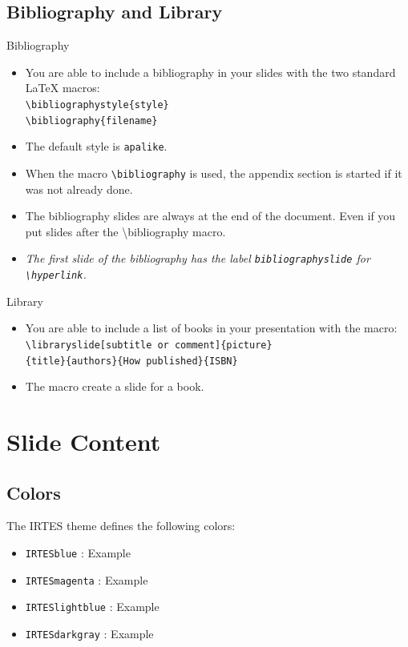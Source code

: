 \documentclass[english,circlenumberstyle]{irtesbeamer}
\begin{document}
\subsection{Bibliography and Library}
\begin{frame}{Bibliography}
	\begin{itemize}
	\item You are able to include a bibliography in your slides with the two standard {\LaTeX} macros: \\
		\texttt{{\textbackslash}bibliographystyle\{style\}} \\
		\texttt{{\textbackslash}bibliography\{filename\}}
	\item The default style is \texttt{apalike}.
	\item When the macro \texttt{{\textbackslash}bibliography} is used, the appendix section is started if it was not already done.
	\item The bibliography slides are \alert{always} at the end of the document. Even if you put slides after the {\textbackslash}bibliography macro.
	\item \emph{The first slide of the bibliography has the label \texttt{bibliographyslide} for \texttt{{\textbackslash}hyperlink}.}
	\end{itemize}
\end{frame}

\begin{frame}{Library}
	\begin{itemize}
	\item You are able to include a list of books in your presentation with the macro: \\
		\texttt{{\textbackslash}libraryslide[subtitle or comment]\{picture\}} \\
		\texttt{\{title\}\{authors\}\{How published\}\{ISBN\}}
	\item The macro create a slide for a book.
	\end{itemize}
\end{frame}

\section{Slide Content}

\subsection{Colors}
\begin{frame}{\subsecname}
	The IRTES theme defines the following colors:
	\begin{itemize}
	\item \texttt{IRTESblue} : \textcolor{IRTESblue}{Example}
	\item \texttt{IRTESmagenta} : \textcolor{IRTESmagenta}{Example}
	\item \texttt{IRTESlightblue} : \textcolor{IRTESlightblue}{Example}
	\item \texttt{IRTESdarkgray} : \textcolor{IRTESdarkgray}{Example}
	\end{itemize}
\end{frame}
\end{document}
